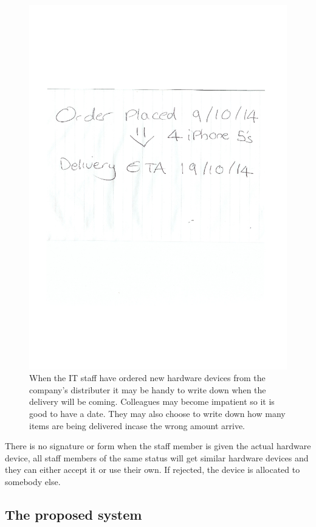 \begin{figure}[H]
\includegraphics[width=.9\textwidth,height=.9\textheight,keepaspectratio]{OrdersPlaced.jpg}
\caption{When the IT staff have ordered new hardware devices from the company's distributer it may be handy to write down when the delivery will be coming. Colleagues may become impatient so it is good to have a date. They may also choose to write down how many items are being delivered incase the wrong amount arrive.} \label{OrdersPlaced}
\end{figure}

There is no signature or form when the staff member is given the actual hardware device, all staff members of the same status will get similar hardware devices and they can either accept it or use their own. If rejected, the device is allocated to somebody else.

\subsection{The proposed system}

